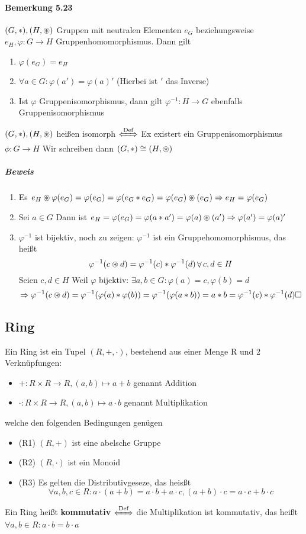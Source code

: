 \documentclass[a4paper]{scrartcl}
\DeclareMathOperator{\Forall}{\forall}
\theoremstyle{definition}
\theoremstyle{plain}
\theoremstyle{plain}
\theoremstyle{remark}
\theoremstyle{remark}
\theoremstyle{remark}
\begin{document}
\paragraph{Bemerkung 5.23}
\label{sec-3-1-8-2}
$(G,*),(H,\oast)$ Gruppen mit neutralen Elementen $e_G$ beziehungsweise $e_H,\varphi:G\to H$ Gruppenhomomorphismus. Dann gilt
\begin{enumerate}
\item $\varphi(e_G) = e_H$
\item $\Forall a\in G:\varphi(a') = \varphi(a)'$ (Hierbei ist $'$ das Inverse)
\item Ist $\varphi$ Gruppenisomorphismus, dann gilt $\varphi^{-1}:H\to G$ ebenfalls Gruppenisomorphismus
\end{enumerate}
$(G,*),(H,\oast)$ heißen isomorph $\xLeftrightarrow{\text{Def}}$ Ex existert ein Gruppenisomorphismus $\phi:G\to H$ Wir schreiben dann $(G,*) \cong (H,\oast)$
\subparagraph{Beweis}
\label{sec-3-1-8-2-1}
\begin{enumerate}
\item Es $e_H\oast \varphi(e_G) = \varphi(e_G) = \varphi(e_G*e_G) = \varphi(e_G) \oast(e_G) \Rightarrow e_H = \varphi(e_G)$
\item Sei $a\in G$ Dann ist $e_H = \varphi(e_G) = \varphi(a*a') = \varphi(a)\oast(a') \Rightarrow \varphi(a') = \varphi(a)'$
\item $\varphi^{-1}$ ist bijektiv, noch zu zeigen: $\varphi^{-1}$ ist ein Gruppehomomorphismus, das heißt
\[\varphi^{-1}(c\oast d) = \varphi^{-1}(c)*\varphi^{-1}(d) \Forall c,d\in H\]
Seien $c,d\in H$ Weil $\varphi$ bijektiv: $\exists a,b\in G:\varphi(a) = c,\varphi(b) =d$
\[\Rightarrow \varphi^{-1}(c\oast d) = \varphi^{-1}(\varphi(a)*\varphi(b)) = \varphi^{-1}(\varphi(a*b)) = a*b = \varphi^{-1}(c)*\varphi^{-1}(d)\hfill\square\]
\end{enumerate}
\subsection{Ring}
\label{sec-3-2}
Ein Ring ist ein Tupel $(R,+,\cdot)$, bestehend aus einer Menge R und 2 Verknüpfungen:
\begin{itemize}
\item $+:R\times R \to R,(a,b)\mapsto a + b$ \hfill genannt Addition
\item $\cdot:R\times R\to R, (a,b)\mapsto a\cdot b$ \hfill genannt Multiplikation
\end{itemize}
welche den folgenden Bedingungen genügen
\begin{itemize}
\item (R1) $(R,+)$ ist eine abelsche Gruppe
\item (R2) $(R,\cdot)$ ist ein Monoid
\item (R3) Es gelten die Distributivgeseze, das heisßt
\[\Forall a,b,c\in R: a\cdot(a + b) = a\cdot b + a\cdot c, (a+b)\cdot c = a\cdot c + b\cdot c\]
\end{itemize}
Ein Ring heißt \textbf{kommutativ} $\xLeftrightarrow{\text{Def}}$ die Multiplikation ist kommutativ, das heißt $\Forall a,b\in R: a\cdot b = b\cdot a$
\end{document}
